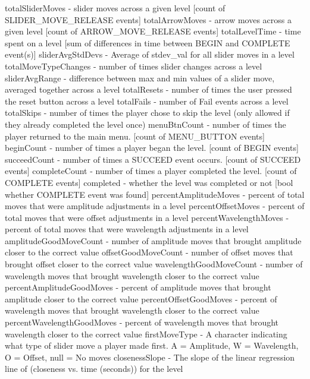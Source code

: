 total\+Slider\+Moves -\/ slider moves across a given level \mbox{[}count of \textquotesingle{}S\+L\+I\+D\+E\+R\+\_\+\+M\+O\+V\+E\+\_\+\+R\+E\+L\+E\+A\+SE\textquotesingle{} events\mbox{]} total\+Arrow\+Moves -\/ arrow moves across a given level \mbox{[}count of \textquotesingle{}A\+R\+R\+O\+W\+\_\+\+M\+O\+V\+E\+\_\+\+R\+E\+L\+E\+A\+SE\textquotesingle{} events\mbox{]} total\+Level\+Time -\/ time spent on a level \mbox{[}sum of differences in time between \textquotesingle{}B\+E\+G\+IN\textquotesingle{} and \textquotesingle{}C\+O\+M\+P\+L\+E\+TE\textquotesingle{} event(s)\mbox{]} slider\+Avg\+Std\+Devs -\/ Average of stdev\+\_\+val for all slider moves in a level total\+Move\+Type\+Changes -\/ number of times \textquotesingle{}slider\textquotesingle{} changes across a level slider\+Avg\+Range -\/ difference between max and min values of a slider move, averaged together across a level total\+Resets -\/ number of times the user pressed the \textquotesingle{}reset\textquotesingle{} button across a level total\+Fails -\/ number of \textquotesingle{}Fail\textquotesingle{} events across a level total\+Skips -\/ number of times the player chose to skip the level (only allowed if they already completed the level once) menu\+Btn\+Count -\/ number of times the player returned to the main menu. \mbox{[}count of \textquotesingle{}M\+E\+N\+U\+\_\+\+B\+U\+T\+T\+ON\textquotesingle{} events\mbox{]} begin\+Count -\/ number of times a player \textquotesingle{}began\textquotesingle{} the level. \mbox{[}count of \textquotesingle{}B\+E\+G\+IN\textquotesingle{} events\mbox{]} succeed\+Count -\/ number of times a \textquotesingle{}S\+U\+C\+C\+E\+ED\textquotesingle{} event occurs. \mbox{[}count of \textquotesingle{}S\+U\+C\+C\+E\+ED\textquotesingle{} events\mbox{]} complete\+Count -\/ number of times a player \textquotesingle{}completed\textquotesingle{} the level. \mbox{[}count of \textquotesingle{}C\+O\+M\+P\+L\+E\+TE\textquotesingle{} events\mbox{]} completed -\/ whether the level was completed or not \mbox{[}bool whether \textquotesingle{}C\+O\+M\+P\+L\+E\+TE\textquotesingle{} event was found\mbox{]} percent\+Amplitude\+Moves -\/ percent of total moves that were amplitude adjustments in a level percent\+Offset\+Moves -\/ percent of total moves that were offset adjustments in a level percent\+Wavelength\+Moves -\/ percent of total moves that were wavelength adjustments in a level amplitude\+Good\+Move\+Count -\/ number of amplitude moves that brought amplitude closer to the correct value offset\+Good\+Move\+Count -\/ number of offset moves that brought offset closer to the correct value wavelength\+Good\+Move\+Count -\/ number of wavelength moves that brought wavelength closer to the correct value percent\+Amplitude\+Good\+Moves -\/ percent of amplitude moves that brought amplitude closer to the correct value percent\+Offset\+Good\+Moves -\/ percent of wavelength moves that brought wavelength closer to the correct value percent\+Wavelength\+Good\+Moves -\/ percent of wavelength moves that brought wavelength closer to the correct value first\+Move\+Type -\/ A character indicating what type of slider move a player made first. A = Amplitude, W = Wavelength, O = Offset, null = No moves closeness\+Slope -\/ The slope of the linear regression line of (closeness vs. time (seconds)) for the level 